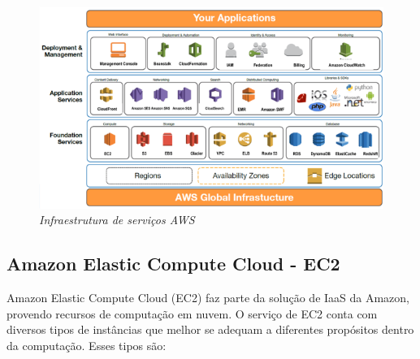 \documentclass[tg]{mdtufsm}
\begin{document}
\begin{figure}
	\centering
	\includegraphics[width=1\textwidth]{aws-arq}
	\caption{\emph{Infraestrutura de serviços AWS \cite{awsarq}}}
	\label{fig:awsArq}
\end{figure}

\subsection{Amazon Elastic Compute Cloud - EC2}

Amazon Elastic Compute Cloud (EC2) faz parte da solução de IaaS da Amazon, provendo recursos de computação em nuvem. O serviço de EC2 conta com diversos tipos de instâncias que melhor se adequam a diferentes propósitos dentro da computação. Esses tipos são:
\end{document}
